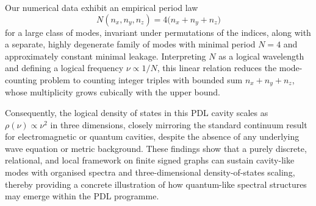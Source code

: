 \documentclass{article}
\theoremstyle{definition}
\begin{document}
Our numerical data exhibit an empirical period law
\[
N(n_x,n_y,n_z) = 4 \bigl(n_x + n_y + n_z\bigr)
\]
for a large class of modes, invariant under permutations of the indices, along with a separate, highly degenerate family of modes with minimal period $N=4$ and approximately constant minimal leakage.\cite{Effective_Fields_PDL_2026} Interpreting $N$ as a logical wavelength and defining a logical frequency $\nu \propto 1/N$, this linear relation reduces the mode-counting problem to counting integer triples with bounded sum $n_x+n_y+n_z$, whose multiplicity grows cubically with the upper bound.\cite{Density_of_states_Notes,Counting_States_2021}

Consequently, the logical density of states in this PDL cavity scales as $\rho(\nu) \propto \nu^2$ in three dimensions, closely mirroring the standard continuum result for electromagnetic or quantum cavities, despite the absence of any underlying wave equation or metric background.\cite{Density_of_states_Notes,EM_Cavities_Notes} These findings show that a purely discrete, relational, and local framework on finite signed graphs can sustain cavity-like modes with organised spectra and three-dimensional density-of-states scaling, thereby providing a concrete illustration of how quantum-like spectral structures may emerge within the PDL programme.\cite{PDL_Main_2026,PDL_Position_2026}



\end{document}
